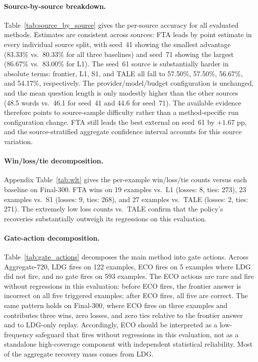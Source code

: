 \paragraph{Source-by-source breakdown.}
Table~\ref{tab:source_by_source} gives the per-source accuracy for all
evaluated methods.
Estimates are consistent across sources: FTA leads by point estimate in
every individual source split, with seed~41 showing the smallest advantage
(83.33\% vs.\ 80.33\% for all three baselines) and seed~71 showing the
largest (86.67\% vs.\ 83.00\% for L1).
The seed~61 source is substantially harder in absolute terms: frontier, L1,
S1, and TALE all fall to 57.50\%, 57.50\%, 56.67\%, and 54.17\%,
respectively.
The provider/model/budget configuration is unchanged, and the mean question
length is only modestly higher than the other sources (48.5 words vs.\ 46.1
for seed~41 and 44.6 for seed~71).
The available evidence therefore points to source-sample difficulty rather
than a method-specific run configuration change.
FTA still leads the best external on seed~61 by $+1.67$ pp, and the
source-stratified aggregate confidence interval accounts for this source
variation.

\paragraph{Win/loss/tie decomposition.}
Appendix Table~\ref{tab:wlt} gives the per-example win/loss/tie counts
versus each baseline on Final-300.
FTA wins on 19 examples vs.\ L1 (losses: 8, ties: 273),
23 examples vs.\ S1 (losses: 9, ties: 268), and 27 examples vs.\ TALE
(losses: 2, ties: 271).
The extremely low loss counts vs.\ TALE confirm that the policy's recoveries
substantially outweigh its regressions on this evaluation.

\paragraph{Gate-action decomposition.}
Table~\ref{tab:gate_actions} decomposes the main method into gate actions.
Across Aggregate-720, LDG fires on 122 examples, ECO fires on 5 examples
where LDG did not fire, and no gate fires on 593 examples.
The ECO actions are rare and fire without regressions in this evaluation: before ECO fires, the frontier
answer is incorrect on all five triggered examples; after ECO fires, all
five are correct.
The same pattern holds on Final-300, where ECO fires on three examples and
contributes three wins, zero losses, and zero ties relative to the frontier
answer and to LDG-only replay.
Accordingly, ECO should be interpreted as a low-frequency safeguard that
fires without regressions in this evaluation, not as a standalone high-coverage component
with independent statistical reliability.
Most of the aggregate recovery mass comes from LDG.

